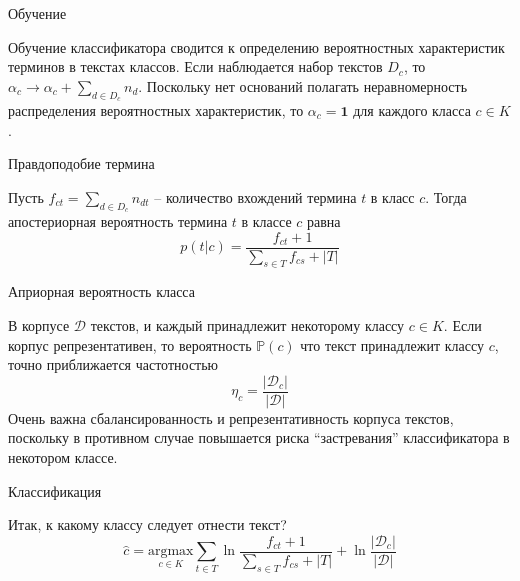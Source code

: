 \documentclass{beamer}
\newcommand{\brac}[1]{\left ( #1 \right )}
\newcommand{\induc}[1]{\left . #1 \right \vert}
\newcommand{\abs}[1]{\left | #1 \right |}
\newcommand{\Dcal}{\mathcal{D}}
\begin{document}
\begin{frame}
  \begin{block}{Обучение}

    Обучение классификатора сводится к определению вероятностных характеристик терминов в текстах классов.
    Если наблюдается набор текстов $D_c$, то $\alpha_c \to \alpha_c + \sum_{d\in D_c}n_d$.
    Поскольку нет оснований полагать неравномерность распределения вероятностных характеристик, то $\alpha_c = \mathbf{1}$ для каждого класса $c\in K$.
  \end{block}
  \begin{block}{Правдоподобие термина}

    Пусть $f_{ct} = \sum_{d\in D_c} n_{dt}$ -- количество вхождений термина $t$ в класс $c$.
    Тогда апостериорная вероятность термина $t$ в классе $c$ равна
    \[p\brac{\induc{t}c} = \frac{ f_{ct} + 1}{ \sum_{s\in T}f_{cs} + \abs{T}}\]
  \end{block}
\end{frame}

\begin{frame}
  \begin{block}{Априорная вероятность класса}

    В корпусе $\Dcal$ текстов, и каждый принадлежит некоторому классу $c\in K$. Если корпус репрезентативен, то вероятность $\mathbb{P}(c)$ что текст принадлежит классу $c$, точно приближается частотностью
    \[\eta_c = \frac{\abs{\Dcal_c}}{\abs{\Dcal}}\]
    Очень важна сбалансированность и репрезентативность корпуса текстов, поскольку в противном случае повышается риска ``застревания'' классификатора в некотором классе.
  \end{block}
  \begin{block}{Классификация}

    Итак, к какому классу следует отнести текст?
    \[\hat{c} = \underset{c\in K}{\text{argmax}} \sum_{t\in T} \ln \frac{f_{ct} + 1}{\sum_{s\in T}f_{cs} + \abs{T}} + \ln\frac{\abs{\Dcal_c}}{\abs{\Dcal}}\]
  \end{block}
\end{frame}

\end{document}
